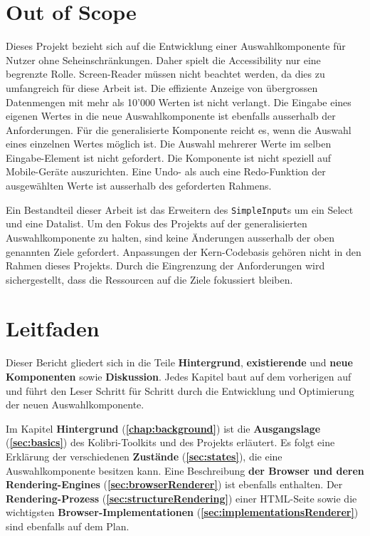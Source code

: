 \section{Out of Scope}
\label{sec:outOfScope}

Dieses Projekt bezieht sich auf die Entwicklung einer Auswahlkomponente für Nutzer ohne Seheinschränkungen.
Daher spielt die Accessibility nur eine begrenzte Rolle.
Screen-Reader müssen nicht beachtet werden, da dies zu umfangreich für diese Arbeit ist.
Die effiziente Anzeige von übergrossen Datenmengen mit mehr als 10'000 Werten ist nicht verlangt.
Die Eingabe eines eigenen Wertes in die neue Auswahlkomponente ist ebenfalls ausserhalb der Anforderungen.
Für die generalisierte Komponente reicht es, wenn die Auswahl eines einzelnen Wertes möglich ist.
Die Auswahl mehrerer Werte im selben Eingabe-Element ist nicht gefordert.
Die Komponente ist nicht speziell auf Mobile-Geräte auszurichten. 
Eine Undo- als auch eine Redo-Funktion der ausgewählten Werte ist ausserhalb des geforderten Rahmens. 

Ein Bestandteil dieser Arbeit ist das Erweitern des \texttt{SimpleInput}s um ein Select und eine Datalist.
Um den Fokus des Projekts auf der generalisierten Auswahlkomponente zu halten, sind keine Änderungen ausserhalb der oben genannten Ziele gefordert.
Anpassungen der Kern-Codebasis gehören nicht in den Rahmen dieses Projekts.
Durch die Eingrenzung der Anforderungen wird sichergestellt, dass die Ressourcen auf die Ziele fokussiert bleiben.


\section{Leitfaden}
\label{sec:tocTexted}

Dieser Bericht gliedert sich in die Teile \textbf{Hintergrund}, \textbf{existierende} und \textbf{neue Komponenten} sowie \textbf{Diskussion}.
Jedes Kapitel baut auf dem vorherigen auf und führt den Leser Schritt für Schritt durch die Entwicklung und Optimierung der neuen Auswahlkomponente.

Im Kapitel \textbf{Hintergrund} (\textbf{\ref{chap:background}}) ist die \textbf{Ausgangslage} (\textbf{\ref{sec:basics}}) des Kolibri-Toolkits und des Projekts erläutert.
Es folgt eine Erklärung der verschiedenen \textbf{Zustände} (\textbf{\ref{sec:states}}), die eine Auswahlkomponente besitzen kann. 
Eine Beschreibung \textbf{der Browser und deren Rendering-Engines} (\textbf{\ref{sec:browserRenderer}}) ist ebenfalls enthalten.
Der \textbf{Rendering-Prozess} (\textbf{\ref{sec:structureRendering}}) einer HTML-Seite sowie die wichtigsten \textbf{Browser-Implementationen} (\textbf{\ref{sec:implementationsRenderer}}) sind ebenfalls auf dem Plan.

